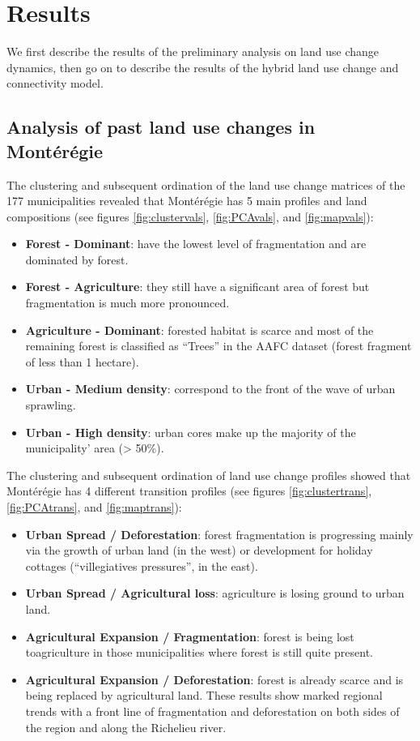 \section{Results}

We first describe the results of the preliminary analysis on land use change dynamics, then go on to describe the results of the hybrid land use change and connectivity model.\\

\subsection{Analysis of past land use changes in Montérégie}

The clustering and subsequent ordination of the land use change matrices of the 177 municipalities revealed that Montérégie has 5 main profiles and land compositions (see figures \ref{fig:clustervals}, \ref{fig:PCAvals}, and \ref{fig:mapvals}):
\renewcommand{\labelitemi}{$\textendash$}
\begin{itemize}[leftmargin=0.5cm]
 \item \textbf{Forest - Dominant}: have the lowest level of fragmentation and are dominated by forest.
 \item \textbf{Forest - Agriculture}: they still have a significant area of forest but fragmentation is much more pronounced.
 \item \textbf{Agriculture - Dominant}: forested habitat is scarce and most of the remaining forest is classified as “Trees” in the AAFC dataset (forest fragment of less than 1 hectare).
 \item \textbf{Urban - Medium density}: correspond to the front of the wave of urban sprawling.
 \item \textbf{Urban - High density}: urban cores make up the majority of the municipality’ area (> 50\%).
\end{itemize}

The clustering and subsequent ordination of land use change profiles showed that Montérégie has 4 different transition profiles (see figures \ref{fig:clustertrans}, \ref{fig:PCAtrans}, and \ref{fig:maptrans}):
\begin{itemize}[leftmargin=0.5cm]
 \item \textbf{Urban Spread / Deforestation}: forest fragmentation is progressing mainly via the growth of urban land (in the west) or development for holiday cottages (“villegiatives pressures”, in the east).
 \item \textbf{Urban Spread / Agricultural loss}: agriculture is losing ground to urban land.
 \item \textbf{Agricultural Expansion / Fragmentation}: forest is being lost toagriculture in those municipalities where forest is still quite present.
 \item \textbf{Agricultural Expansion / Deforestation}: forest is already scarce and is being replaced by agricultural land.
These results show marked regional trends with a front line of fragmentation and deforestation on both sides of the region and along the Richelieu river. \\ %
\end{itemize}

